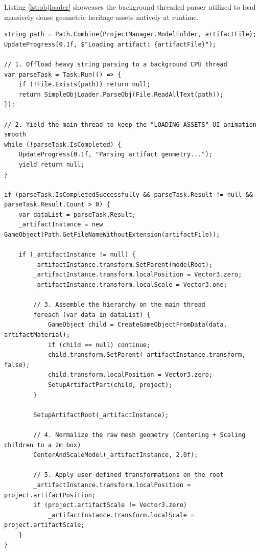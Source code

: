 Listing \ref{lst:objloader} showcases the background threaded parser utilized to load massively dense geometric heritage assets natively at runtime.

\begin{lstlisting}[language={[Sharp]C}, caption={RuntimeModelLoader.cs: Multi-threaded `.obj` chunk parsing avoiding main-thread freezes, followed by strict spatial normalization constraints.}, label={lst:objloader}]
string path = Path.Combine(ProjectManager.ModelFolder, artifactFile);
UpdateProgress(0.1f, $"Loading artifact: {artifactFile}");

// 1. Offload heavy string parsing to a background CPU thread
var parseTask = Task.Run(() => {
    if (!File.Exists(path)) return null;
    return SimpleObjLoader.ParseObj(File.ReadAllText(path));
});

// 2. Yield the main thread to keep the "LOADING ASSETS" UI animation smooth
while (!parseTask.IsCompleted) {
    UpdateProgress(0.1f, "Parsing artifact geometry...");
    yield return null;
}

if (parseTask.IsCompletedSuccessfully && parseTask.Result != null && parseTask.Result.Count > 0) {
    var dataList = parseTask.Result;
    _artifactInstance = new GameObject(Path.GetFileNameWithoutExtension(artifactFile));
    
    if (_artifactInstance != null) {
        _artifactInstance.transform.SetParent(modelRoot);
        _artifactInstance.transform.localPosition = Vector3.zero;
        _artifactInstance.transform.localScale = Vector3.one;

        // 3. Assemble the hierarchy on the main thread
        foreach (var data in dataList) {
            GameObject child = CreateGameObjectFromData(data, artifactMaterial);
            if (child == null) continue;
            child.transform.SetParent(_artifactInstance.transform, false);
            child.transform.localPosition = Vector3.zero;
            SetupArtifactPart(child, project); 
        }

        SetupArtifactRoot(_artifactInstance);
        
        // 4. Normalize the raw mesh geometry (Centering + Scaling children to a 2m box)
        CenterAndScaleModel(_artifactInstance, 2.0f);

        // 5. Apply user-defined transformations on the root
        _artifactInstance.transform.localPosition = project.artifactPosition;
        if (project.artifactScale != Vector3.zero) 
            _artifactInstance.transform.localScale = project.artifactScale;
    }
}
\end{lstlisting}


